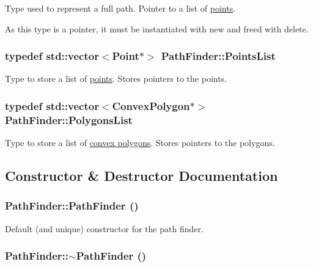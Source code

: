 Type used to represent a full path. Pointer to a list of \hyperlink{structPathFinder_1_1Point}{points}. 

As this type is a pointer, it must be instantiated with new and freed with delete. \hypertarget{classPathFinder_a792a34ce673309f873090141c3d96f1c}{
\subsubsection[{PointsList}]{\setlength{\rightskip}{0pt plus 5cm}typedef std::vector$<${\bf Point}$\ast$$>$ {\bf PathFinder::PointsList}}}
\label{classPathFinder_a792a34ce673309f873090141c3d96f1c}


Type to store a list of \hyperlink{structPathFinder_1_1Point}{points}. Stores pointers to the points. 

\hypertarget{classPathFinder_a16ed073fa542c82fd09e582cb4fbed24}{
\subsubsection[{PolygonsList}]{\setlength{\rightskip}{0pt plus 5cm}typedef std::vector$<${\bf ConvexPolygon}$\ast$$>$ {\bf PathFinder::PolygonsList}}}
\label{classPathFinder_a16ed073fa542c82fd09e582cb4fbed24}


Type to store a list of \hyperlink{structPathFinder_1_1ConvexPolygon}{convex polygons}. Stores pointers to the polygons. 



\subsection{Constructor \& Destructor Documentation}
\hypertarget{classPathFinder_a0761f248c1ebaacf3e47a4021ca25256}{
\subsubsection[{PathFinder}]{\setlength{\rightskip}{0pt plus 5cm}PathFinder::PathFinder ()}}
\label{classPathFinder_a0761f248c1ebaacf3e47a4021ca25256}


Default (and unique) constructor for the path finder. 

\hypertarget{classPathFinder_acc04bc8bcddfda54da6a2905b256cf90}{
\subsubsection[{$\sim$PathFinder}]{\setlength{\rightskip}{0pt plus 5cm}PathFinder::$\sim$PathFinder ()}}
\label{classPathFinder_acc04bc8bcddfda54da6a2905b256cf90}


